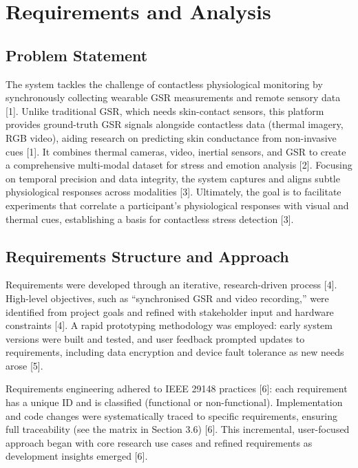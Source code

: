 
\chapter{Requirements and Analysis}
\label{ch:requirements}


\section{Problem Statement}

The system tackles the challenge of contactless physiological monitoring by synchronously collecting wearable GSR measurements and remote sensory data [1]. Unlike traditional GSR, which needs skin-contact sensors, this platform provides ground-truth GSR signals alongside contactless data (thermal imagery, RGB video), aiding research on predicting skin conductance from non-invasive cues [1]. It combines thermal cameras, video, inertial sensors, and GSR to create a comprehensive multi-modal dataset for stress and emotion analysis [2]. Focusing on temporal precision and data integrity, the system captures and aligns subtle physiological responses across modalities [3]. Ultimately, the goal is to facilitate experiments that correlate a participant's physiological responses with visual and thermal cues, establishing a basis for contactless stress detection [3].


\section{Requirements Structure and Approach}

Requirements were developed through an iterative, research-driven process [4]. High-level objectives, such as “synchronised GSR and video recording,” were identified from project goals and refined with stakeholder input and hardware constraints [4]. A rapid prototyping methodology was employed: early system versions were built and tested, and user feedback prompted updates to requirements, including data encryption and device fault tolerance as new needs arose [5].

Requirements engineering adhered to IEEE 29148 practices [6]: each requirement has a unique ID and is classified (functional or non-functional). Implementation and code changes were systematically traced to specific requirements, ensuring full traceability (see the matrix in Section 3.6) [6]. This incremental, user-focused approach began with core research use cases and refined requirements as development insights emerged [6].


